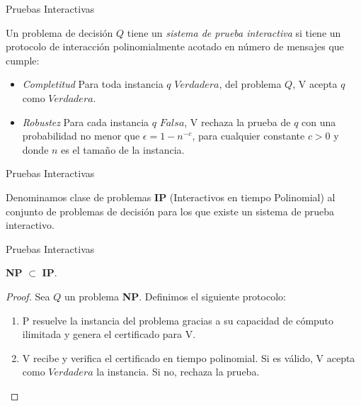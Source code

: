 \documentclass{beamer}
\begin{document}
\begin{frame}{Pruebas Interactivas}
	\begin{definition}
		
		Un problema de decisión $Q$ tiene un \textit{sistema de prueba interactiva} si tiene un protocolo de interacción polinomialmente acotado en número de mensajes que cumple:
		
		\begin{itemize}
			\item \textit{Completitud} Para toda instancia $q$ $Verdadera$, del problema $Q$, V acepta $q$ como $Verdadera$.
			\item \textit{Robustez} Para cada instancia $q$ $Falsa$, V rechaza la prueba de $q$ con una probabilidad no menor que $\epsilon = 1-n^{-c}$, para cualquier constante $c>0$ y donde $n$ es el tamaño de la instancia.
		\end{itemize}
		
	\end{definition}
\end{frame}


\begin{frame}{Pruebas Interactivas}


\begin{definition}
	Denominamos clase de problemas \textbf{IP} (Interactivos en tiempo Polinomial) al conjunto de problemas de decisión para los que existe un sistema de prueba interactivo.
\end{definition}


\end{frame}



\begin{frame}{Pruebas Interactivas}
	\begin{theorem}
		\textbf{NP} $\subset$ \textbf{IP}.
	\end{theorem}
	
	\begin{proof}
		Sea $Q$ un problema \textbf{NP}. Definimos el siguiente protocolo:
		\begin{enumerate}
			\item  P resuelve la instancia del problema gracias a su capacidad de cómputo ilimitada y genera el certificado para V.
			\item  V recibe y verifica el certificado en tiempo polinomial. Si es válido, V acepta como $Verdadera$ la instancia. Si no, rechaza la prueba.
		\end{enumerate}
	\end{proof}
\end{frame}
\end{document}
